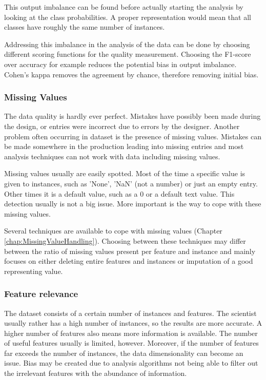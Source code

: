 \documentclass[10pt,a4paper]{report}
\begin{document}
	This output imbalance can be found before actually starting the analysis by looking at the class probabilities. A proper representation would mean that all classes have roughly the same number of instances. 
	
	Addressing this imbalance in the analysis of the data can be done by choosing different scoring functions for the quality measurement. Choosing the F1-score over accuracy for example reduces the potential bias in output imbalance. Cohen's kappa removes the agreement by chance, therefore removing initial bias.
	
	\subsubsection{Missing Values}
	\label{DEsubsec:MissingValues}
	
	The data quality is hardly ever perfect. Mistakes have possibly been made during the design, or entries were incorrect due to errors by the designer. Another problem often occurring in dataset is the presence of missing values. Mistakes can be made somewhere in the production leading into missing entries and most analysis techniques can not work with data including missing values.
	
	Missing values usually are easily spotted. Most of the time a specific value is given to instances, such as 'None', 'NaN' (not a number) or just an empty entry. Other times it is a default value, such as a $0$ or a default text value. This detection usually is not a big issue. More important is the way to cope with these missing values.
	
	Several techniques are available to cope with missing values (Chapter \ref{chap:MissingValueHandling}). Choosing between these techniques may differ between the ratio of missing values present per feature and instance and mainly focuses on either deleting entire features and instances or imputation of a good representing value.
	
	\subsubsection{Feature relevance}
	\label{DEsubsec:FeatureSelection}
	
	The dataset consists of a certain number of instances and features. The scientist usually rather has a high number of instances, so the results are more accurate. A higher number of features also means more information is available. The number of useful features usually is limited, however. Moreover, if the number of features far exceeds the number of instances, the data dimensionality can become an issue. Bias may be created due to analysis algorithms not being able to filter out the irrelevant features with the abundance of information.
	
\end{document}
